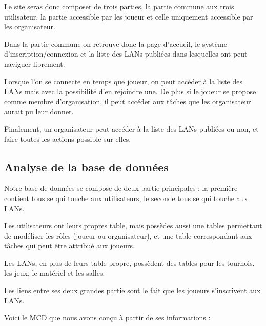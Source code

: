 \documentclass[12pt]{article}
\begin{document}
Le site seras donc composer de trois parties, la partie commune aux trois utilisateur, la partie accessible par les joueur et celle uniquement accessible par les organisateur.
\newline

Dans la partie commune on retrouve donc la page d'accueil, le système d'inscription/connexion et la liste des LANs publiées dans lesquelles ont peut naviguer librement.
\newline

Lorsque l'on se connecte en temps que joueur, on peut accéder à la liste des LANs mais avec la possibilité d'en rejoindre une. De plus si le joueur se propose comme membre d'organisation, il peut accéder aux tâches que les organisateur aurait pu leur donner.
\newline

Finalement, un organisateur peut accéder à la liste des LANs publiées ou non, et faire toutes les actions possible sur elles.
\newpage
\subsection{Analyse de la base de données}

Notre base de données se compose de deux partie principales : la première contient tous se qui touche aux utilisateurs, le seconde tous se qui touche aux LANs.
\newline

Les utilisateurs ont leurs propres table, mais possèdes aussi une tables permettant de modéliser les rôles (joueur ou organisateur), et une table correspondant aux tâches qui peut être attribué aux joueurs.
\newline

Les LANs, en plus de leurs table propre, possèdent des tables pour les tournois, les jeux, le matériel et les salles.
\newline

Les liens entre ses deux grandes partie sont le fait que les joueurs s'inscrivent aux LANs.
\newline

Voici le MCD que nous avons conçu à partir de ses informations :
\end{document}
